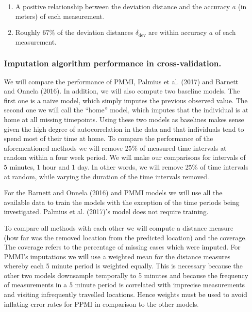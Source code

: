 \documentclass[man]{apa6}
\providecommand{\tightlist}{%
  \setlength{\itemsep}{0pt}\setlength{\parskip}{0pt}}
\theoremstyle{definition}
\theoremstyle{definition}
\theoremstyle{definition}
\theoremstyle{remark}
\begin{document}
\begin{enumerate}
\def\labelenumi{\arabic{enumi}.}
\tightlist
\item
  A positive relationship between the deviation distance and the
  accuracy \(a\) (in meters) of each measurement.
\item
  Roughly 67\% of the deviation distances \(\delta_{\text{dev}}\) are
  within accuracy \(a\) of each measurement.
\end{enumerate}

\subsubsection{Imputation algorithm performance in
cross-validation.}\label{imputation-algorithm-performance-in-cross-validation.}

We will compare the performance of PMMI, Palmius et al. (2017) and
Barnett and Onnela (2016). In addition, we will also compute two
baseline models. The first one is a naive model, which simply imputes
the previous observed value. The second one we will call the
\enquote{home} model, which imputes that the individual is at home at
all missing timepoints. Using these two models as baselines makes sense
given the high degree of autocorrelation in the data and that
individuals tend to spend most of their time at home. To compare the
performance of the aforementioned methods we will remove 25\% of
measured time intervals at random within a four week period. We will
make our comparisons for intervals of 5 minutes, 1 hour and 1 day. In
other words, we will remove 25\% of time intervals at random, while
varying the duration of the time intervals removed.

For the Barnett and Onnela (2016) and PMMI models we will use all the
available data to train the models with the exception of the time
periods being investigated. Palmius et al. (2017)'s model does not
require training.

To compare all methods with each other we will compute a distance
measure (how far was the removed location from the predicted location)
and the coverage. The coverage refers to the percentage of missing cases
which were imputed. For PMMI's imputations we will use a weighted mean
for the distance measures whereby each 5 minute period is weighted
equally. This is necessary because the other two models downsample
temporally to 5 minutes and because the frequency of measurements in a 5
minute period is correlated with imprecise measurements and visiting
infrequently travelled locations. Hence weights must be used to avoid
inflating error rates for PPMI in comparison to the other models.
\end{document}
